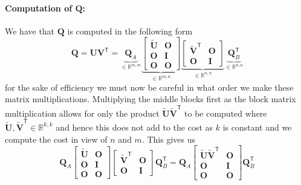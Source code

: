 \documentclass{article}
\newcommand\tr{\mathsf{T}}
\begin{document}
\paragraph{Computation of $\mathbf{Q}$:} We have that $\mathbf{Q}$ is computed in the following form 
\begin{equation*}
    \mathbf{Q} = \mathbf{U}\mathbf{V}^{\tr} = \underbrace{\mathbf{Q}_{A}}_{\in \mathbb{R}^{m,m}} \underbrace{\begin{bmatrix}
        \mathbf{\tilde{U}} & \mathbf{O} \\
        \mathbf{O} & \mathbf{I} \\
        \mathbf{O} & \mathbf{O}
    \end{bmatrix}}_{\in \mathbb{R}^{m,n}}\underbrace{\begin{bmatrix}
        \mathbf{\tilde{V}}^{\tr} & \mathbf{O} \\
        \mathbf{O} & \mathbf{I}
    \end{bmatrix}}_{\in \mathbb{R}^{n,n}}\underbrace{\mathbf{Q}_{B}^{\tr}}_{\in \mathbb{R}^{n,n}}
\end{equation*}
for the sake of efficiency we must now be careful in what order we make these matrix multiplications. Multiplying the middle blocks first as the block matrix multiplication allows for only the product $\mathbf{\tilde{U}}\mathbf{\tilde{V}}^{\tr}$ to be computed where $\mathbf{\tilde{U}}, \mathbf{\tilde{V}}^{\tr} \in \mathbb{R}^{k,k}$ and hence this does not add to the cost as $k$ is constant and we compute the cost in view of $n$ and $m$. This gives us
\begin{equation*}
    \mathbf{Q}_{A}\begin{bmatrix}
        \mathbf{\tilde{U}} & \mathbf{O} \\
        \mathbf{O} & \mathbf{I} \\
        \mathbf{O} & \mathbf{O}
    \end{bmatrix}\begin{bmatrix}
        \mathbf{\tilde{V}}^{\tr} & \mathbf{O} \\
        \mathbf{O} & \mathbf{I}
    \end{bmatrix}\mathbf{Q}_{B}^{\tr} = \mathbf{Q}_{A}
    \begin{bmatrix}
      \mathbf{\tilde{U}}\mathbf{\tilde{V}}^{\tr}  & \mathbf{O} \\
      \mathbf{O} & \mathbf{I} \\
      \mathbf{O} & \mathbf{O}
      
    \end{bmatrix}
    \mathbf{Q}_{B}^{\tr}
\end{equation*}
\end{document}
